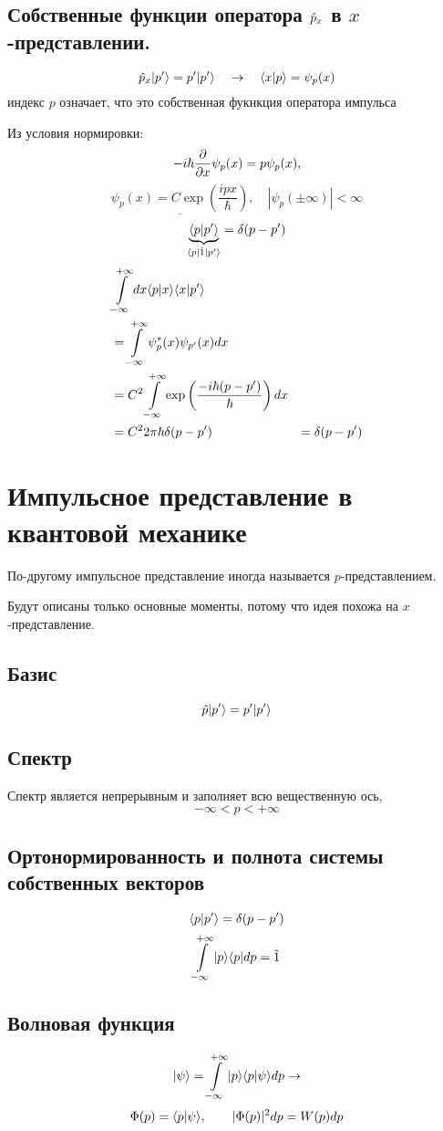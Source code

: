 \subsection{Собственные функции оператора $\Hat{p}_x$ в $x$-представлении.}
%
$$
    \Hat {p}_x | p' \rangle  = p' | p' \rangle \quad \to \quad \langle x | p \rangle = \psi_p (x)
$$
\Rem индекс $p$ означает, что это собственная фукнкция оператора импульса

Из условия нормировки:
$$
    -i\hbar \dfrac{\partial }{\partial x} \psi_p (x) = p \psi_p(x),
$$
$$
    \underline{\psi_p(x) = C \exp\left( \dfrac{ipx}{\hbar}\right)}, \quad |\psi_p ( \pm \infty)|< \infty
$$
\Proof
$$
    \underbrace{\langle p | p' \rangle}_{{ \langle p |\Hat 1| p' \rangle }} = \delta(p - p') 
$$
\begin{eqnarray*}
    &\int\limits_{-\infty}^{+\infty} dx \langle p | x \rangle \langle x | p' \rangle\\
    &= \int\limits_{-\infty}^{+\infty} \psi^\ast_p(x) \psi_{p'} (x) dx\\
    &= C^2 \int\limits_{-\infty}^{+\infty} \exp\left( \dfrac{-i \hbar (p-p')}{\hbar} \right) dx\\
    &= C^2 2\pi \hbar \delta(p-p')
    &= \delta(p-p')
\end{eqnarray*}
\section{Импульсное представление в квантовой механике}
По-другому импульсное представление иногда называется $p$-представлением.

Будут описаны только основные моменты, потому что идея похожа на $x$-представление.

\subsection{Базис}
$$
    \Hat p | p' \rangle = p' | p' \rangle
$$
\subsection{Спектр}
Спектр является непрерывным и заполняет всю вещественную ось,
$$
    -\infty < p < +\infty
$$
\subsection{Ортонормированность и полнота системы собственных векторов}
$$
    \langle p | p' \rangle = \delta(p - p')
$$
$$
    \int\limits_{-\infty}^{+\infty} | p \rangle \langle p | dp = \Hat 1
$$
\subsection{Волновая функция}
$$
    | \psi \rangle = \int\limits_{-\infty}^{+\infty} | p \rangle \langle p | \psi \rangle  dp \to
$$
$$
    \Phi(p) = \langle p | \psi \rangle, \qquad |\Phi(p)|^2 dp = W(p) dp
$$
